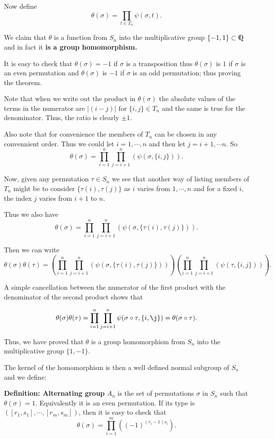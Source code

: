\documentclass[12pt]{article}
\newcommand{\deff}[1]{{\bf Definition: #1} }
\def\DQ{ \mbox{\rm\hbox{Q \kern-0.85em\raise0.25ex
    	\hbox{\vrule height5.4pt width0.7pt} \kern0.45em}} }
\begin{document}
Now define
$$\theta(\sigma)=\prod_{t\in T_n}\psi(\sigma,t).$$

We claim that $\theta$ is a function from $S_n$ into the multiplicative
group $\{-1,1\}\subset \DQ$ and in fact it {\bf is a group
homomorphism.}

It is easy to check that $\theta(\sigma)=-1$ if $\sigma$ is a
transposition thus $\theta(\sigma)$ is $1$ if $\sigma$ is an even
permutation and $\theta(\sigma)$ is $-1$ if $\sigma$ is an odd
permutation; thus proving the theorem.

Note that when we write out the product in $\theta(\sigma)$ the
absolute values of the terms in the numerator are $|(i-j)|$ for $\{i,j\}\in T_n$
and the same is true for the denominator. Thus, the ratio is clearly
$\pm 1$.

Also note that for convenience the members of $T_n$ can be chosen in
any convennient order. Thus we could let $i=1,\cdots,n$ and then let
$j=i+1,\cdots n$. So
$$\theta(\sigma)=\prod_{i=1}^n\prod_{j=i+1}^n \left(\psi(\sigma,\{i,j\})\right).$$

Now, given any permutation $\tau\in S_n$ we see that another way of
listing members of $T_n$ might be to consider $\{\tau(i),\tau(j)\}$ as
$i$ varies from $1,\cdots,n$ and for a fixed $i$, the index $j$ varies
from $i+1$ to $n$.

Thus we also have
$$\theta(\sigma)=
\prod_{i=1}^n\prod_{j=i+1}^n \left(\psi(\sigma,\{\tau(i),\tau(j)\})\right).$$

Then we can write
$$\theta(\sigma)\theta(\tau)=
\left(\prod_{i=1}^n\prod_{j=i+1}^n
\left(\psi(\sigma,\{\tau(i),\tau(j)\})\right)\right)
\left(\prod_{i=1}^n\prod_{j=i+1}^n
\left(\psi(\tau,\{i,j\})\right)\right).$$

A simple cancellation between the numerator of the first product with
the denominator of the second product shows that

$$\theta(\sigma)\theta(\tau)=
\prod_{i=1}^n\prod_{j=i+1}^n
\psi(\sigma\circ\tau,\{i,\j\})=\theta(\sigma\circ\tau).$$

Thus, we have proved that $\theta$ is a group homomorphism from $S_n$
into the multiplicative group $\{1,-1\}$.

The kernel of the homomorphism is then a well defined normal subgroup of
$S_n$ and we define:

\deff{Alternating group}
$A_n$ is the set of permutations $\sigma$ in $S_n$ such that $\theta(\sigma)=1$.
Equivalently it is an even permutation. If its type is
$([r_1,s_1],\cdots,[r_m,s_m])$, then it is easy to check that
$$\theta(\sigma)=\prod_{i=1}^m\left((-1)^{(r_i-1)s_i}\right).$$
\end{document}
